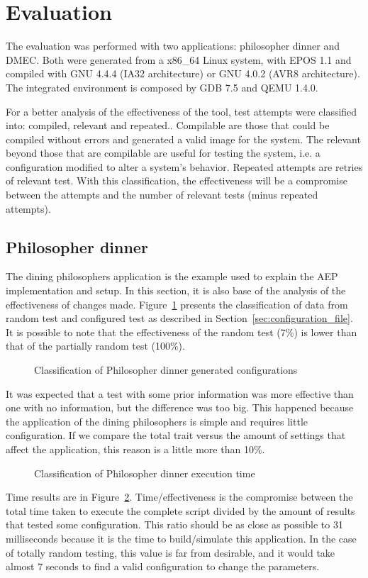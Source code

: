 \documentclass[conference]{IEEEtran}
\newcommand{\fig}[4][thb]{
  \begin{figure}[#1] {\centering{\texttt{[image: fig/\#2]}}\par}
    \captionsetup{font=small}
    \caption{#3\label{fig:#2}}
  \end{figure}
}
\begin{document}
\section{Evaluation}
\label{sec:evaluation}
The evaluation was performed with two applications: philosopher dinner and DMEC. Both were generated from a x86\_64 Linux system, with EPOS 1.1 and compiled with GNU 4.4.4 (IA32 architecture) or GNU 4.0.2 (AVR8 architecture). The integrated environment is composed by GDB 7.5 and QEMU 1.4.0.

For a better analysis of the effectiveness of the tool, test attempts were classified into: compiled, relevant and repeated.. Compilable are those that could be compiled without errors and generated a valid image for the system. The relevant beyond those that are compilable are useful for testing the system, i.e. a configuration modified to alter a system's behavior. Repeated attempts are retries of relevant test. With this classification, the effectiveness will be a compromise between the attempts and the number of relevant tests (minus repeated attempts).

\subsection{Philosopher dinner}
The dining philosophers application is the example used to explain the AEP implementation and setup. In this section, it is also base of the analysis of the effectiveness of changes made. Figure~\ref{fig:philosopher_results} presents the classification of data from random test and configured test as described in Section~\ref{sec:configuration_file}. It is possible to note that the effectiveness of the random test (7\%) is lower than that of the partially random test (100\%).

\fig{philosopher_results}{Classification of Philosopher dinner generated configurations}{scale=.48}

It was expected that a test with some prior information was more effective than one with no information, but the difference was too big. This happened because the application of the dining philosophers is simple and requires little configuration. If we compare the total trait versus the amount of settings that affect the application, this reason is a little more than 10\%.

\fig{philosopher_time_results}{Classification of Philosopher dinner execution time}{scale=.45}

Time results are in Figure~\ref{fig:philosopher_time_results}. Time/effectiveness is the compromise between the total time taken to execute the complete script divided by the amount of results that tested some configuration. This ratio should be as close as possible to 31 milliseconds because it is the time to build/simulate this application. In the case of totally random testing, this value is far from desirable, and it would take almost 7 seconds to find a valid configuration to change the parameters.
\end{document}
